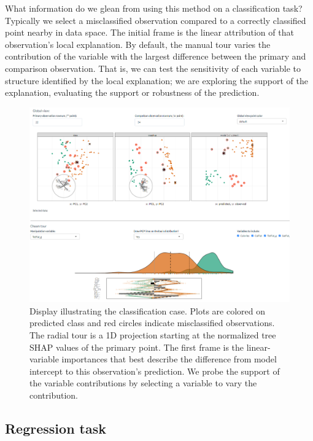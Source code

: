 \documentclass[
  article]{article}
\begin{document}
What information do we glean from using this method on a classification task? Typically we select a misclassified observation compared to a correctly classified point nearby in data space. The initial frame is the linear attribution of that observation's local explanation. By default, the manual tour varies the contribution of the variable with the largest difference between the primary and comparison observation. That is, we can test the sensitivity of each variable to structure identified by the local explanation; we are exploring the support of the explanation, evaluating the support or robustness of the prediction.

\begin{figure}

{\centering \includegraphics[width=1\linewidth]{./figures/app_classification} 

}

\caption{Display illustrating the classification case. Plots are  colored on predicted class and red circles indicate misclassified observations. The radial tour is a 1D projection starting at the normalized tree SHAP values of the primary point. The first frame is the linear-variable importances that best describe the difference from model intercept to this observation's prediction. We probe the support of the variable contributions by selecting a variable to vary the contribution.}\label{fig:classificationcase}
\end{figure}

\hypertarget{regression-task}{%
\subsection{Regression task}\label{regression-task}}
\end{document}
